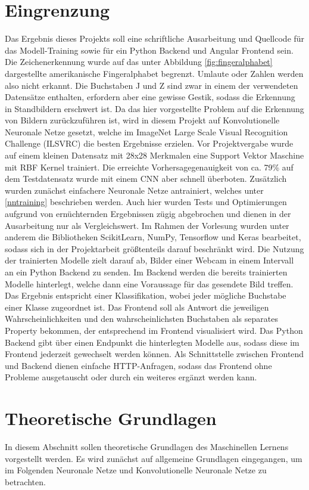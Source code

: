 \documentclass[11pt,bibliography=totocnumbered]{scrartcl}
\begin{document}
\section{Eingrenzung}
\label{eingrenzung}
Das Ergebnis dieses Projekts soll eine schriftliche Ausarbeitung und Quellcode für das Modell-Training sowie für ein Python Backend und Angular Frontend sein. Die Zeichenerkennung wurde auf das unter Abbildung \ref{fig:fingeralphabet} dargestellte amerikanische Fingeralphabet begrenzt. Umlaute oder Zahlen werden also nicht erkannt. Die Buchstaben J und Z sind zwar in einem der verwendeten Datensätze enthalten, erfordern aber eine gewisse Gestik, sodass die Erkennung in Standbildern erschwert ist. Da das hier vorgestellte Problem auf die Erkennung von Bildern zurückzuführen ist, wird in diesem Projekt auf Konvolutionelle Neuronale Netze gesetzt, welche im ImageNet Large Scale Visual Recognition Challenge (ILSVRC) die besten Ergebnisse erzielen. Vor Projektvergabe wurde auf einem kleinen Datensatz mit 28x28 Merkmalen eine Support Vektor Maschine mit RBF Kernel trainiert. Die erreichte Vorhersagegenauigkeit von ca. 79\% auf dem Testdatensatz wurde mit einem CNN aber schnell überboten. Zusätzlich wurden zunächst einfachere Neuronale Netze antrainiert, welches unter \ref{nntraining} beschrieben werden. Auch hier wurden Tests und Optimierungen aufgrund von ernüchternden Ergebnissen zügig abgebrochen und dienen in der Ausarbeitung nur als Vergleichswert. Im Rahmen der Vorlesung wurden unter anderem die Bibliotheken ScikitLearn, NumPy, Tensorflow und Keras bearbeitet, sodass sich in der Projektarbeit größtenteils darauf beschränkt wird.  Die Nutzung der trainierten Modelle zielt darauf ab, Bilder einer Webcam in einem Intervall an ein Python Backend zu senden. Im Backend werden die bereits trainierten Modelle hinterlegt, welche dann eine Voraussage für das gesendete Bild treffen. Das Ergebnis entspricht einer Klassifikation, wobei jeder mögliche Buchstabe einer Klasse zugeordnet ist. Das Frontend soll als Antwort die jeweiligen Wahrscheinlichkeiten und den wahrscheinlichsten Buchstaben als separates Property bekommen, der entsprechend im Frontend visualisiert wird. Das Python Backend gibt über einen Endpunkt die hinterlegten Modelle aus, sodass diese im Frontend jederzeit gewechselt werden können. Als Schnittstelle zwischen Frontend und Backend dienen einfache HTTP-Anfragen, sodass das Frontend ohne Probleme ausgetauscht oder durch ein weiteres ergänzt werden kann.
\section{Theoretische Grundlagen}
In diesem Abschnitt sollen theoretische Grundlagen des Maschinellen Lernens vorgestellt werden. Es wird zunächst auf allgemeine Grundlagen eingegangen, um im Folgenden Neuronale Netze und Konvolutionelle Neuronale Netze zu betrachten.
\end{document}
